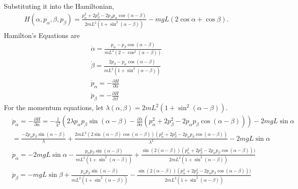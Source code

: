 \begin{solution}[8.1]
Substituting it into the Hamiltonian,
\begin{align}
H(\alpha, p_\alpha, \beta, p_\beta) = \frac{p^2_\alpha + 2p^2_\beta - 2p_\beta p_\alpha\cos(\alpha-\beta)}{2mL^2(1+\sin^2(\alpha - \beta))}- mgL(2\cos \alpha + \cos \beta).
\end{align}
Hamilton's Equations are
\begin{align}
    \dot{\alpha} = \frac{p_\alpha- p_\beta \cos(\alpha-\beta)}{mL^2(2-\cos^2(\alpha - \beta))} \\
    \dot{\beta} = \frac{2p_\beta - p_\alpha \cos(\alpha-\beta)}{mL^2(1+\sin^2(\alpha - \beta))}\\
    \dot{p}_\alpha = -\frac{\partial H}{\partial \alpha} \\
    \dot{p}_\beta = -\frac{\partial H}{\partial \beta} 
\end{align}
For the momentum equations, let $\lambda(\alpha, \beta) = 2mL^2(1+\sin^2(\alpha - \beta))$.
\begin{align}
&\dot{p}_\alpha = -\frac{\partial H}{\partial \alpha}= -\frac{1}{\lambda^2}\left(2\lambda p_\alpha p_\beta \sin(\alpha -\beta ) - \frac{\partial \lambda}{\partial \alpha}(p^2_\alpha + 2p^2_\beta-2p_\alpha p_\beta \cos(\alpha-\beta))\right) - 2mgL\sin \alpha \\
& = \frac{-2p_\alpha p_\beta \sin(\alpha - \beta)}{\lambda}+ \frac{2mL^2(2\sin(\alpha-\beta)\cos(\alpha-\beta))(p^2_\alpha + 2p^2_\beta-2p_\alpha p_\beta \cos(\alpha-\beta))}{\lambda^2} - 2mgL\sin \alpha \\
& \dot{p}_\alpha = -2mgL \sin \alpha- \frac{p_\alpha p_\beta \sin(\alpha -\beta)}{mL^2 (1+\sin^2(\alpha-\beta))} + \frac{\sin(2(\alpha-\beta))(p^2_\alpha + 2p^2_\beta-2p_\alpha p_\beta \cos(\alpha-\beta)))}{2mL^2 (1+\sin^2(\alpha-\beta))} \\
&\dot{p}_\beta = -mgL\sin\beta + \frac{p_\alpha p_\beta \sin(\alpha -\beta)}{mL^2 (1+\sin^2(\alpha-\beta))} - \frac{\sin(2(\alpha-\beta))(p^2_\alpha + 2p^2_\beta-2p_\alpha p_\beta \cos(\alpha-\beta)))}{2mL^2 (1+\sin^2(\alpha-\beta))}
\end{align}



\end{solution}

